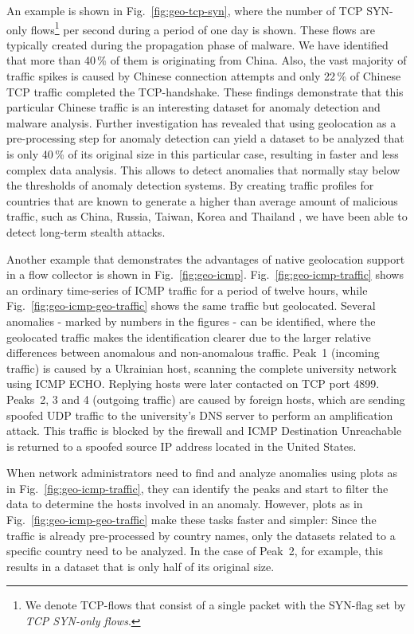 An example is shown in Fig.~\ref{fig:geo-tcp-syn}, where the number of TCP SYN-only flows\footnote{We denote TCP-flows that consist of a single packet with the SYN-flag set by \textit{TCP SYN-only flows}.} per second during a period of one day is shown. These flows are typically created during the propagation phase of malware. We have identified that more than 40\,\% of them is originating from China. Also, the vast majority of traffic spikes is caused by Chinese connection attempts and only 22\,\% of Chinese TCP traffic completed the TCP-handshake. These findings demonstrate that this particular Chinese traffic is an interesting dataset for anomaly detection and malware analysis. Further investigation has revealed that using geolocation as a pre-processing step for anomaly detection can yield a dataset to be analyzed that is only 40\,\% of its original size in this particular case, resulting in faster and less complex data analysis. This allows to detect anomalies that normally stay below the thresholds of anomaly detection systems. By creating traffic profiles for countries that are known to generate a higher than average amount of malicious traffic, such as China, Russia, Taiwan, Korea and Thailand \cite{vanPolen-2011-Finding}, we have been able to detect long-term stealth attacks.

Another example that demonstrates the advantages of native geolocation support in a flow collector is shown in Fig.~\ref{fig:geo-icmp}. Fig.~\ref{fig:geo-icmp-traffic} shows an ordinary time-series of ICMP traffic for a period of twelve hours, while Fig.~\ref{fig:geo-icmp-geo-traffic} shows the same traffic but geolocated. Several anomalies - marked by numbers in the figures - can be identified, where the geolocated traffic makes the identification clearer due to the larger relative differences between anomalous and non-anomalous traffic. Peak~1 (incoming traffic) is caused by a Ukrainian host, scanning the complete university network using ICMP ECHO. Replying hosts were later contacted on TCP port 4899. Peaks~2, 3 and 4 (outgoing traffic) are caused by foreign hosts, which are sending spoofed UDP traffic to the university's DNS server to perform an amplification attack. This traffic is blocked by the firewall and ICMP Destination Unreachable is returned to a spoofed source IP address located in the United States.

When network administrators need to find and analyze anomalies using plots as in Fig.~\ref{fig:geo-icmp-traffic}, they can identify the peaks and start to filter the data to determine the hosts involved in an anomaly. However, plots as in Fig.~\ref{fig:geo-icmp-geo-traffic} make these tasks faster and simpler: Since the traffic is already pre-processed by country names, only the datasets related to a specific country need to be analyzed. In the case of Peak~2, for example, this results in a dataset that is only half of its original size.

